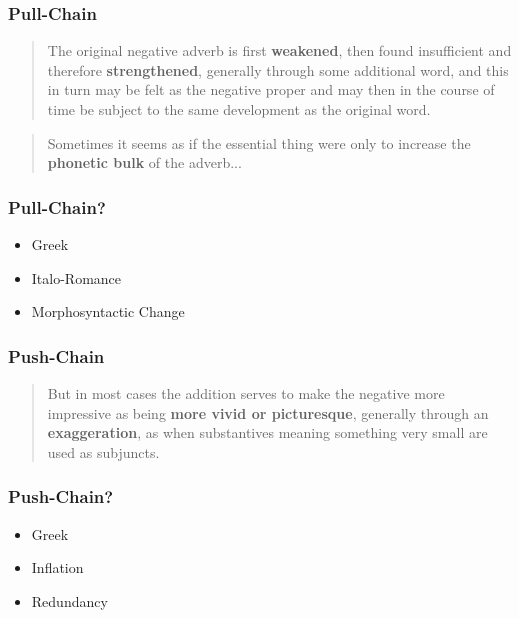 \documentclass[compress]{beamer}
\begin{document}
\begin{frame}
\frametitle{Pull-Chain}
      \begin{block}{}
      \begin{quote}
	The original negative adverb is first \textbf{weakened}, then found insufficient and therefore \textbf{strengthened}, generally through some additional word, and this in turn may be felt as the negative proper and may then in the course of time be subject to the same development as the original word.
      \end{quote}           
      \end{block}
      \begin{block}{}
      \begin{quote}
	Sometimes it seems as if the essential thing were only to increase the \textbf{phonetic bulk} of the adverb...
      \end{quote}           
      \end{block}
\end{frame}

\begin{frame}
\frametitle{Pull-Chain?}
      \begin{block}{}
	\begin{itemize}
	     \item Greek \cite{kiparsky-condoravdi:2006}
	     \item Italo-Romance \cite{posner1985}
	     \item Morphosyntactic Change
	\end{itemize}
      \end{block}
\end{frame}


\begin{frame}
\frametitle{Push-Chain}
      \begin{block}{}
      \begin{quote}
	But in most cases the addition serves to make the negative more impressive as being \textbf{more vivid or picturesque}, generally through an \textbf{exaggeration}, as when substantives meaning something very small are used as subjuncts.
      \end{quote}           
      \end{block}
\end{frame}

\begin{frame}
\frametitle{Push-Chain?}
      \begin{block}{}
	\begin{itemize}
	     \item Greek \cite{kiparsky-condoravdi:2006}
	     \item Inflation \cite{dahl:2001}
	     \item Redundancy \cite{detges-waltereit2002}
	\end{itemize}
      \end{block}
\end{frame}
\end{document}
